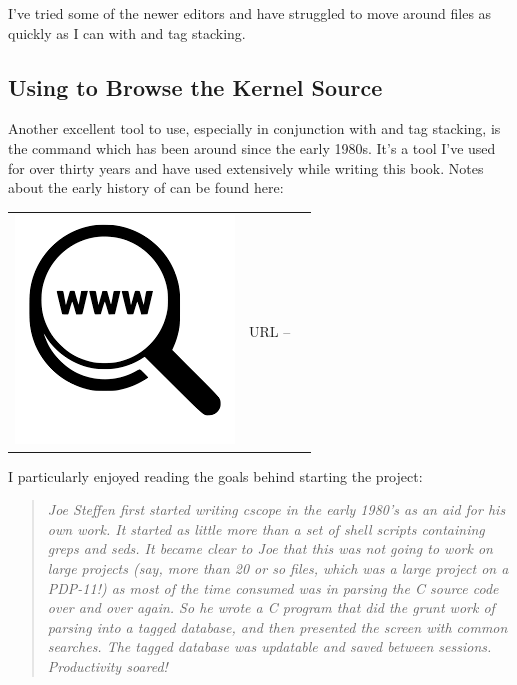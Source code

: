 I've tried some of the newer editors and have struggled to move around files as quickly as I can with  and tag stacking.

\subsection{Using  to Browse the Kernel Source}

Another excellent tool to use, especially in conjunction with  and tag stacking, is the  command which has been around since the early 1980s. It's a tool I've used for over thirty years and have used extensively while writing this book. Notes about the early history of  can be found here:

\begin{table}[h]
\begin{tabular}{lcl}
\parbox[r]{0.5in}{\includegraphics[scale=0.15]{figures/url.png}} & \parbox[l]{0.55in}{URL  -- } & \parbox[l]{3in}{}
\end{tabular}
\end{table}

I particularly enjoyed reading the goals behind starting the project:

\begin{quote}
\textit{Joe Steffen first started writing cscope in the early 1980's as an aid for his own work. It started as little more than a set of shell scripts containing greps and seds. It became clear to Joe that this was not going to work on large projects (say, more than 20 or so files, which was a large project on a PDP-11!) as most of the time consumed was in parsing the C source code over and over again. So he wrote a C program that did the grunt work of parsing into a tagged database, and then presented the screen with common searches. The tagged database was updatable and saved between sessions. Productivity soared!}
\end{quote}

